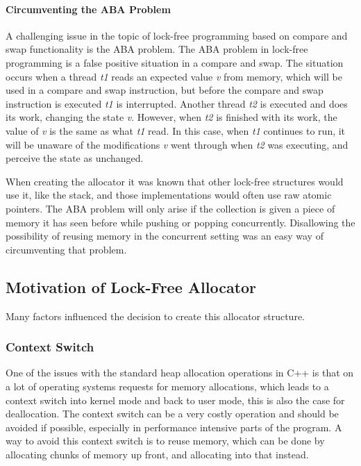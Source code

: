 \paragraph{Circumventing the ABA Problem}
\label{subpar:detailed_lock_free_allocator_aba}
A challenging issue in the topic of lock-free programming based on compare and swap functionality is the ABA problem.
The ABA problem in lock-free programming is a false positive situation in a compare and swap\cite{understanding_and_preventing_aba_problem}.
The situation occurs when a thread \textit{t1} reads an expected value \textit{v} from memory,
which will be used in a compare and swap instruction, but before
the compare and swap instruction is executed \textit{t1} is interrupted.
Another thread \textit{t2} is executed and does its work, changing the state \textit{v}.
However, when \textit{t2} is finished with its work, the value of \textit{v} is the same as what \textit{t1} read.
In this case, when \textit{t1} continues to run, it will be unaware of the modifications \textit{v} went through
when \textit{t2} was executing, and perceive the state as unchanged.

When creating the allocator it was known that other lock-free structures would use it, like the stack, and those implementations would often use raw atomic pointers.
The ABA problem will only arise if the collection is given a piece of memory it has seen before while pushing or popping concurrently.
Disallowing the possibility of reusing memory in the concurrent setting was an easy way of circumventing that problem.

\subsection{Motivation of Lock-Free Allocator}
Many factors influenced the decision to create this allocator structure.

\subsubsection{Context Switch}
One of the issues with the standard heap allocation operations in C++ is that on a lot of operating systems requests for memory allocations, which leads to a context switch into
kernel mode and back to user mode, this is also the case for deallocation.
The context switch can be a very costly operation and should be avoided if possible, especially in performance intensive parts of the program\cite[p. 240]{game_engine_architecture}.
A way to avoid this context switch is to reuse memory, which can be done by allocating
chunks of memory up front, and allocating into that instead.


